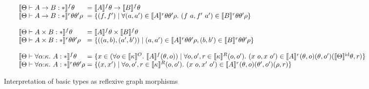 \documentclass{sigplanconf}
\newcommand{\sepbar}{\mathrel|}
\theoremstyle{examplestyle}
\newcommand{\sem}[1]{\llbracket #1 \rrbracket}
\newcommand{\semKU}[1]{\llbracket #1 \rrbracket^O}
\newcommand{\semKR}[1]{\llbracket #1 \rrbracket^R}
\newcommand{\semKI}[1]{\llbracket #1 \rrbracket^{\mathrm{id}}}
\begin{document}
\begin{figure*}[t]
  \begin{displaymath}
    \begin{array}{l@{\hspace{0.3em}}c@{\hspace{0.3em}}l}
      \sem{\Theta \vdash A \to B : *}^f \theta & = & \sem{A}^f\theta \to \sem{B}^f\theta \\
      \sem{\Theta \vdash A \to B : *}^r\theta\theta'\rho & = &
      \{ (f,f') \sepbar \forall (a,a') \in \sem{A}^r\theta\theta'\rho.\ (f~a, f'~a') \in \sem{B}^r\theta\theta'\rho \} \\
      \\
      \sem{\Theta \vdash A \times B : *}^f \theta & = & \sem{A}^f\theta \times \sem{B}^f\theta \\
      \sem{\Theta \vdash A \times B : *}^r\theta\theta'\rho & = &
      \{ ((a,b),(a',b')) \sepbar (a,a') \in \sem{A}^r\theta\theta'\rho, (b,b') \in \sem{B}^r\theta\theta'\rho \} \\
      \\
      \sem{\Theta \vdash \forall \alpha\mathord:\kappa.~A : *}^f \theta &=& \{
      \begin{array}[t]{@{}l}
        x \in (\forall o \in \semKU{\kappa}.\ \sem{A}^f(\theta, o)) \sepbar
        \forall o,o',r \in \semKR{\kappa}(o,o').\ (x~o, x~o') \in \sem{A}^r(\theta,o)(\theta,o')(\semKI{\Theta} \theta, r) \}
      \end{array} \\
      \sem{\Theta \vdash \forall \alpha\mathord:\kappa.~A : *}^r\theta\theta'\rho &=& \{ (x,x') \sepbar \forall o, o', r \in \semKR{\kappa}(o,o').\ (x~o, x'~o') \in \sem{A}^r(\theta,o)(\theta',o')(\rho, r) \}
    \end{array}
  \end{displaymath}
  \caption{Interpretation of basic types as reflexive graph morphisms}
  \label{fig:basic-type-interpretation}
\end{figure*}
\end{document}
